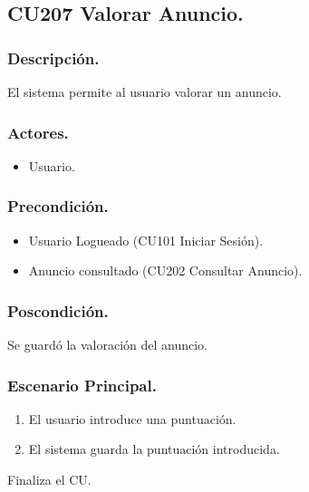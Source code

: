 \subsection{CU207 Valorar Anuncio.}
\subsubsection{Descripci\'{o}n.}
El sistema permite al usuario valorar un anuncio.
\subsubsection{Actores.}
\begin{itemize}
\item Usuario.
\end{itemize}
\subsubsection{Precondici\'{o}n.}
\begin{itemize}
\item Usuario Logueado (CU101 Iniciar Sesi\'{o}n).
\item Anuncio consultado (CU202 Consultar Anuncio).
\end{itemize}
\subsubsection{Poscondici\'{o}n.}
Se guard\'{o} la valoraci\'{o}n del anuncio.
\subsubsection{Escenario Principal.}
\begin{enumerate}
\item El usuario introduce una puntuaci\'{o}n.
\item El sistema guarda la puntuaci\'{o}n introducida.
\end{enumerate}
Finaliza el CU.
